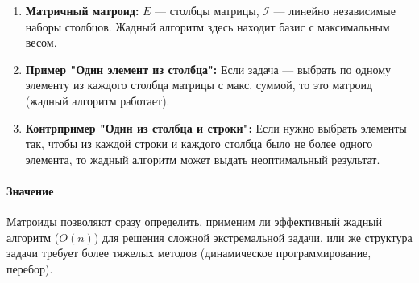 \begin{enumerate}
    \item \textbf{Матричный матроид:} $E$ — столбцы матрицы, $\mathcal{I}$ — линейно независимые наборы столбцов. Жадный алгоритм здесь находит базис с максимальным весом.
    \item \textbf{Пример "Один элемент из столбца":} Если задача — выбрать по одному элементу из каждого столбца матрицы с макс. суммой, то это матроид (жадный алгоритм работает).
    \item \textbf{Контрпример "Один из столбца и строки":} Если нужно выбрать элементы так, чтобы из каждой строки и каждого столбца было не более одного элемента, то жадный алгоритм может выдать неоптимальный результат.
\end{enumerate}

\paragraph{Значение}
Матроиды позволяют сразу определить, применим ли эффективный жадный алгоритм ($O(n)$) для решения сложной экстремальной задачи, или же структура задачи требует более тяжелых методов (динамическое программирование, перебор).
